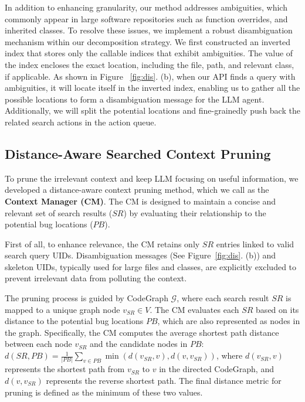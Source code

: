 In addition to enhancing granularity, our method addresses ambiguities, which commonly appear in large software repositories such as function overrides, and inherited classes.  To resolve these issues, we implement a robust disambiguation mechanism within our decomposition strategy. We first constructed an inverted index that stores only the callable indices that exhibit ambiguities. The value of the index encloses the exact location, including the file, path, and relevant class, if applicable. 
As shown in Figure ~\ref{fig:dis}. (b), when our API finds a query with ambiguities, it will locate itself in the inverted index, enabling us to gather all the possible locations to form a disambiguation message for the LLM agent. Additionally, we will split the potential locations and fine-grainedly push back the related search actions in the action queue. 


\subsection{Distance-Aware Searched Context Pruning} \label{context manager}
To prune the irrelevant context and keep LLM focusing on useful information, we developed a distance-aware context pruning method, which we call as the \textbf{Context Manager (CM)}. The CM is designed to maintain a concise and relevant set of search results ($SR$) by evaluating their relationship to the potential bug locations ($PB$).

First of all, to enhance relevance, the CM retains only $SR$ entries linked to valid search query UIDs. Disambiguation messages (See Figure~\ref{fig:dis}. (b)) and skeleton UIDs, typically used for large files and classes, are explicitly excluded to prevent irrelevant data from polluting the context. 

The pruning process is guided by CodeGraph $\mathcal{G}$, where each search result $SR$ is mapped to a unique graph node \( v_{SR} \in V \). The CM evaluates each \( SR \) based on its distance to the potential bug locations \( PB \), which are also represented as nodes in the graph. Specifically, the CM computes the average shortest path distance between each node \( v_{SR} \) and the candidate nodes in \( PB \):
$ d(SR, PB) = \frac{1}{|PB|} \sum_{v \in PB} \min \left( d(v_{SR}, v), d(v, v_{SR}) \right)
$, where \( d(v_{SR}, v) \) represents the shortest path from \( v_{SR} \) to \( v \) in the directed CodeGraph, and \( d(v, v_{SR}) \) represents the reverse shortest path. The final distance metric for pruning is defined as the minimum of these two values.


